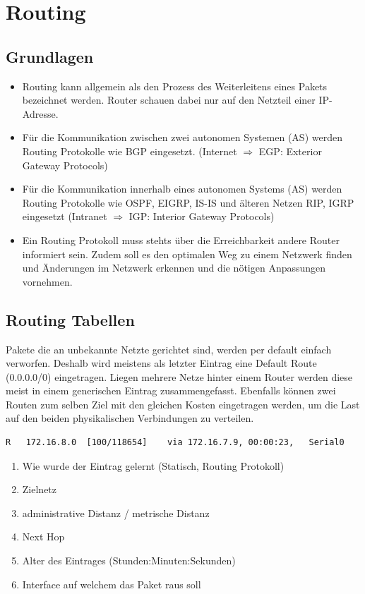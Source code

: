 \section{Routing}
\subsection{Grundlagen}
\begin{itemize}
	\item Routing kann allgemein als den Prozess des Weiterleitens eines Pakets bezeichnet werden. Router schauen dabei nur auf den Netzteil einer IP-Adresse.
	\item Für die Kommunikation zwischen zwei autonomen Systemen (AS) werden Routing Protokolle wie BGP eingesetzt. (Internet $\Rightarrow$ EGP: Exterior Gateway Protocols)
	\item Für die Kommunikation innerhalb eines autonomen Systems (AS) werden Routing Protokolle wie OSPF, EIGRP, IS-IS und älteren Netzen RIP, IGRP eingesetzt (Intranet $\Rightarrow$ IGP: Interior Gateway Protocols)
	\item Ein Routing Protokoll muss stehts über die Erreichbarkeit andere Router informiert sein. Zudem soll es den optimalen Weg zu einem Netzwerk finden und Änderungen im Netzwerk erkennen und die nötigen Anpassungen vornehmen.
\end{itemize}

\subsection{Routing Tabellen}
Pakete die an unbekannte Netzte gerichtet sind, werden per default einfach verworfen. Deshalb wird meistens als letzter Eintrag eine Default Route (0.0.0.0/0) eingetragen. Liegen mehrere Netze hinter einem Router werden diese meist in einem generischen Eintrag zusammengefasst. Ebenfalls können zwei Routen zum selben Ziel mit den gleichen Kosten eingetragen werden, um die Last auf den beiden physikalischen Verbindungen zu verteilen.
\begin{lstlisting}
R	172.16.8.0	[100/118654]	via 172.16.7.9,	00:00:23,	Serial0 \end{lstlisting}	
\begin{enumerate}
	\item Wie wurde der Eintrag gelernt (Statisch, Routing Protokoll)
	\item Zielnetz
	\item administrative Distanz / metrische Distanz
	\item Next Hop
	\item Alter des Eintrages (Stunden:Minuten:Sekunden)
	\item Interface auf welchem das Paket raus soll
\end{enumerate}

